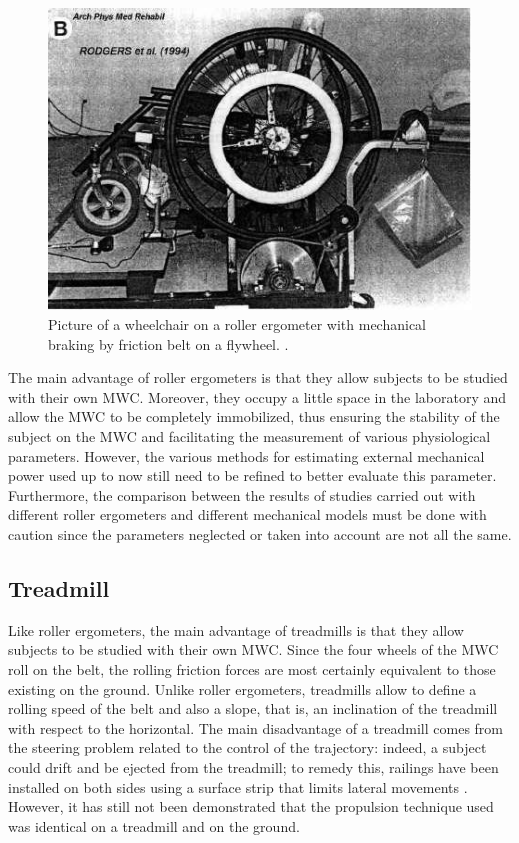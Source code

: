 \begin{figure}[h]
\center
\includegraphics[scale = 25]{images/FRER}
\caption{Picture of a wheelchair on a roller ergometer with mechanical braking by friction belt on a flywheel. \cite{rodgers1994biomechanics}.}
\label{FRER}
\end{figure}

The main advantage of roller ergometers is that they allow subjects to be studied with their own MWC. Moreover, they occupy a little space in the laboratory and allow the MWC to be completely immobilized, thus ensuring the stability of the subject on the MWC and facilitating the measurement of  various physiological parameters. However, the various methods for estimating external  mechanical power used up to now still need to be refined to better evaluate this parameter. Furthermore, the comparison between the results of studies carried out with different roller ergometers and different mechanical models must be done with caution since the parameters neglected or taken into account are not all the same.

\subsection{Treadmill}
Like roller ergometers, the main advantage of treadmills is that they allow subjects to be studied with their own MWC. Since the four wheels of the MWC roll on the belt, the rolling friction forces are most certainly equivalent to those existing on the ground. Unlike roller ergometers, treadmills  allow to define a rolling speed of the belt and also a slope, that is, an inclination of the treadmill with respect to the horizontal. The main disadvantage of a treadmill comes from the steering problem related to the control of the trajectory: indeed, a subject could drift and be ejected from the treadmill; to remedy this, railings have been installed on both sides using a surface strip that limits lateral movements \cite{claremont1985model}. However, it has still not been demonstrated that the propulsion technique used was identical on a treadmill and on the ground.

